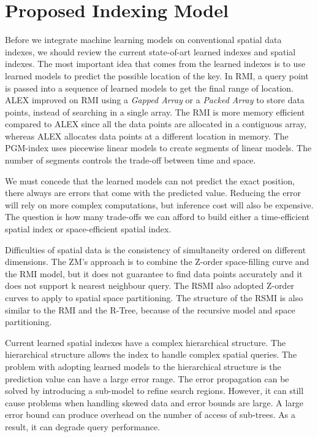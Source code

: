 
\chapter{Proposed Indexing Model}

Before we integrate machine learning models on conventional spatial data indexes, we should review the current state-of-art learned indexes and spatial indexes. The most important idea that comes from the learned indexes is to use learned models to predict the possible location of the key. In RMI, a query point is passed into a sequence of learned models to get the final range of location. ALEX improved on RMI using a \textit{Gapped Array} or a \textit{Packed Array} to store data points, instead of searching in a single array. The RMI is more memory efficient compared to ALEX since all the data points are allocated in a contiguous array, whereas ALEX allocates data points at a different location in memory. The PGM-index uses piecewise linear models to create segments of linear models. The number of segments controls the trade-off between time and space. 

We must concede that the learned models can not predict the exact position, there always are errors that come with the predicted value. Reducing the error will rely on more complex computations, but inference cost will also be expensive. The question is how many trade-offs we can afford to build either a time-efficient spatial index or space-efficient spatial index. 

Difficulties of spatial data is the consistency of simultaneity ordered on different dimensions. The ZM’s approach is to combine the Z-order space-filling curve and the RMI model, but it does not guarantee to find data points accurately and it does not support k nearest neighbour query.  The RSMI also adopted Z-order curves to apply to spatial space partitioning. The structure of the RSMI is also similar to the RMI and the R-Tree, because of the recursive model and space partitioning. 

Current learned spatial indexes have a complex hierarchical structure. The hierarchical structure allows the index to handle complex spatial queries. The problem with adopting learned models to the hierarchical structure is the prediction value can have a large error range. The error propagation can be solved by introducing a sub-model to refine search regions. However, it can still cause problems when handling skewed data and error bounds are large. A large error bound can produce overhead on the number of access of sub-trees. As a result, it can degrade query performance. 

